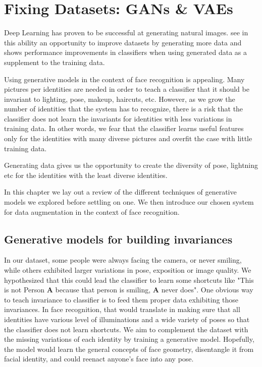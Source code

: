 \chapter{Fixing Datasets: \acsp{GAN} \& \acsp{VAE}}

Deep Learning has proven to be successful at generating natural images. \citet{dagan} see in this ability an opportunity to improve datasets by generating more data and shows performance improvements in classifiers when using generated data as a supplement to the training data.

Using generative models in the context of face recognition is appealing. Many pictures per identities are needed in order to teach a classifier that it should be invariant to lighting, pose, makeup, haircuts, etc. However, as we grow the number of identities that the system has to recognize, there is a risk that the classifier does not learn the invariants for identities with less variations in training data. In other words, we fear that the classifier learns useful features only for the identities with many diverse pictures and overfit the case with little training data.

Generating data gives us the opportunity to create the diversity of pose, lightning etc for the identities with the least diverse identities.

In this chapter we lay out a review of the different techniques of generative models we explored before settling on one. We then introduce our chosen system for data augmentation in the context of face recognition.

\section{Generative models for building invariances}

In our dataset, some people were always facing the camera, or never smiling, while others exhibited larger variations in pose, exposition or image quality. We hypothesized that this could lead the classifier to learn some shortcuts like "This is not Person \textbf{A} because that person is smiling, \textbf{A} never does". One obvious way to teach invariance to classifier is to feed them proper data exhibiting those invariances. In face recognition, that would translate in making sure that all identities have various level of illuminations and a wide variety of poses so that the classifier does not learn shortcuts. We aim to complement the dataset with the missing variations of each identity by training a generative model. Hopefully, the model would learn the general concepts of face geometry, disentangle it from facial identity, and could reenact anyone's face into any pose.

